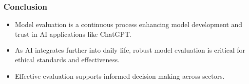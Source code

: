 \documentclass[aspectratio=169]{beamer}
\begin{document}
\begin{frame}[fragile]
    \frametitle{Conclusion}
    \begin{itemize}
        \item Model evaluation is a continuous process enhancing model development and trust in AI applications like ChatGPT.
        \item As AI integrates further into daily life, robust model evaluation is critical for ethical standards and effectiveness.
        \item Effective evaluation supports informed decision-making across sectors.
    \end{itemize}
\end{frame}
\end{document}
